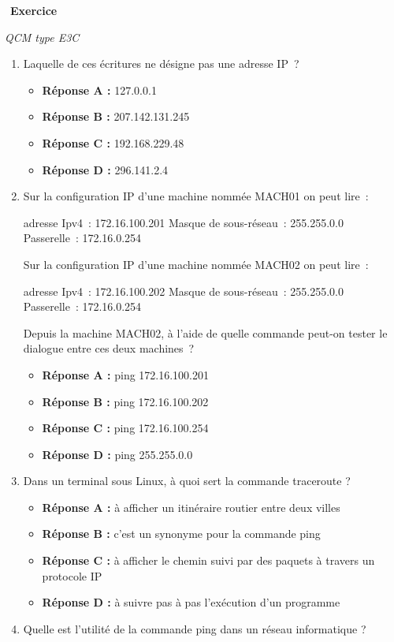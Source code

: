 \documentclass[
  11pt,
]{article}
\providecommand{\tightlist}{%
  \setlength{\itemsep}{0pt}\setlength{\parskip}{0pt}}
\newcounter{exo}
\newenvironment{exercice}[1]
{\par \medskip   \addtocounter{exo}{1} \noindent  
\begin{bclogo}[arrondi =0.1,   noborder = true, logo=\bccrayon, marge=4]{~\textbf{Exercice} \textbf{\theexo} {\itshape #1} }  \par}
{
\end{bclogo}
 \par \bigskip }
\newcounter{def}
\newcounter{prog}
\begin{document}
\begin{exercice}{}

\emph{QCM type E3C}

\begin{enumerate}
\def\labelenumi{\arabic{enumi}.}
\item
  Laquelle de ces écritures ne désigne pas une adresse IP~?

  \begin{itemize}
  \tightlist
  \item
    \textbf{Réponse A :} 127.0.0.1
  \item
    \textbf{Réponse B :} 207.142.131.245
  \item
    \textbf{Réponse C :} 192.168.229.48
  \item
    \textbf{Réponse D :} 296.141.2.4
  \end{itemize}
\item
  Sur la configuration IP d'une machine nommée MACH01 on peut lire~:

  adresse Ipv4~: 172.16.100.201 Masque de sous-réseau~: 255.255.0.0
  Passerelle~: 172.16.0.254

  Sur la configuration IP d'une machine nommée MACH02 on peut lire~:

  adresse Ipv4~: 172.16.100.202 Masque de sous-réseau~: 255.255.0.0
  Passerelle~: 172.16.0.254

  Depuis la machine MACH02, à l'aide de quelle commande peut-on tester
  le dialogue entre ces deux machines~?

  \begin{itemize}
  \tightlist
  \item
    \textbf{Réponse A :} ping 172.16.100.201
  \item
    \textbf{Réponse B :} ping 172.16.100.202
  \item
    \textbf{Réponse C :} ping 172.16.100.254
  \item
    \textbf{Réponse D :} ping 255.255.0.0
  \end{itemize}
\item
  Dans un terminal sous Linux, à quoi sert la commande traceroute ?

  \begin{itemize}
  \tightlist
  \item
    \textbf{Réponse A :} à afficher un itinéraire routier entre deux
    villes
  \item
    \textbf{Réponse B :} c'est un synonyme pour la commande ping
  \item
    \textbf{Réponse C :} à afficher le chemin suivi par des paquets à
    travers un protocole IP
  \item
    \textbf{Réponse D :} à suivre pas à pas l'exécution d'un programme
  \end{itemize}
\item
  Quelle est l'utilité de la commande ping dans un réseau informatique ?


\end{enumerate}
\end{exercice}
\end{document}
